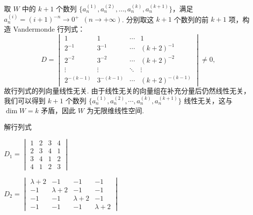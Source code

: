 \begin{exercise}
\begin{exgroup}
\begin{answer}
            取 $W$ 中的 $k+1$ 个数列 $\{a_n^{(1)}, a_n^{(2)}, \ldots, a_n^{(k)}, a_n^{(k+1)}\}$，满足 $a_n^{(i)} = (i+1)^{-n} \to 0^+ \enspace (n \to +\infty)$. 分别取这 $k+1$ 个数列的前 $k+1$ 项，构造 Vandermonde 行列式：
            \[
                D = \begin{vmatrix}
                    1          & 1          & \cdots & 1              \\
                    2^{-1}     & 3^{-1}     & \cdots & (k+2)^{-1}     \\
                    2^{-2}     & 3^{-2}     & \cdots & (k+2)^{-2}     \\
                    \vdots     & \vdots     & \ddots & \vdots         \\
                    2^{-(k-1)} & 3^{-(k-1)} & \cdots & (k+2)^{-(k-1)}
                \end{vmatrix} \neq 0,
            \]
            故行列式的列向量线性无关. 由于线性无关的向量组在补充分量后仍然线性无关，我们可以得到 $k+1$ 个数列 $\{a_n^{(1)}, a_n^{(2)}, \cdots, a_n^{(k)}, a_n^{(k+1)}\}$ 线性无关，这与 $\dim W = k$ 矛盾，因此 $W$ 为无限维线性空间.
        \end{answer}

        \item 解行列式
        \begin{enumerate} \begin{multicols}{2}
                \item $ D_1=\begin{vmatrix}
                        1 & 2 & 3 & 4 \\2&3&4&1\\3&4&1&2\\4&1&2&3
                    \end{vmatrix} $

                \item $ D_2=\begin{vmatrix}
                        \lambda+2 & -1        & -1        & -1        \\
                        -1        & \lambda+2 & -1        & -1        \\
                        -1        & -1        & \lambda+2 & -1        \\
                        -1        & -1        & -1        & \lambda+2
                    \end{vmatrix} $

            \end{multicols} \begin{multicols}{2} %


\end{multicols}
\end{enumerate}
\end{exgroup}
\end{exercise}
